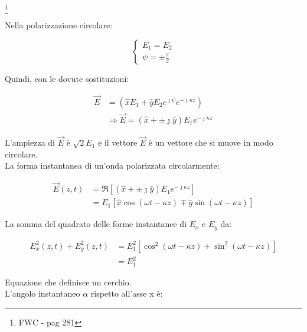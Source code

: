 \footnote{FWC - pag 281}

Nella polarizzazione circolare: 

{\Large \begin{equation}
    \begin{cases}
        E_1 = E_2 \\ 
        \psi = \pm  \frac{\pi}{2}   
    \end{cases}
\end{equation}}

Quindi, con le dovute sostituzioni: 

{\Large \begin{equation}
    \begin{split}
    \vec{E} 
    &= (\hat{x} E_1 + \hat{y} E_2 e^{\jmath \psi } e^{-\jmath \kappa z}) 
    \\
    &\Rightarrow  \vec{E} = (\hat{x} + \pm \jmath \hat{y}) E_1 e^{- \jmath \kappa z}
    \end{split}
\end{equation}}

L'ampiezza di $\vec{E}$ è $\sqrt{2} E_1$ e il vettore $\vec{E}$ è un vettore che si muove in modo circolare. \\ 

La forma instantanea di un'onda polarizzata circolarmente: 

{\Large \begin{equation}
    \begin{split}
        \vec{E} (z, t) &= \Re [(\hat{x} + \pm \jmath \hat{y}) E_1 e^{- \jmath \kappa z} ]  \\
        &= E_1 [\hat{x} \cos(\omega t - \kappa z) \mp \hat{y} \sin(\omega t -\kappa z) ]    
    \end{split}
\end{equation}}

La somma del quadrato delle forme instantanee di $E_x$ e $E_y$ da: 

{\Large \begin{equation}
    \begin{split}
        E_x ^{2} (z, t) + E_y ^{2} (z, t) 
        &= E_1 ^{2} [\cos^{2}(\omega t - \kappa z) + \sin^{2}(\omega t - \kappa z)] 
        \\
        &= E_1 ^{2}
    \end{split}
\end{equation}}

Equazione che definisce un cerchio. \\ 

L'angolo instantaneo $\alpha$ rispetto all'asse x è: 

